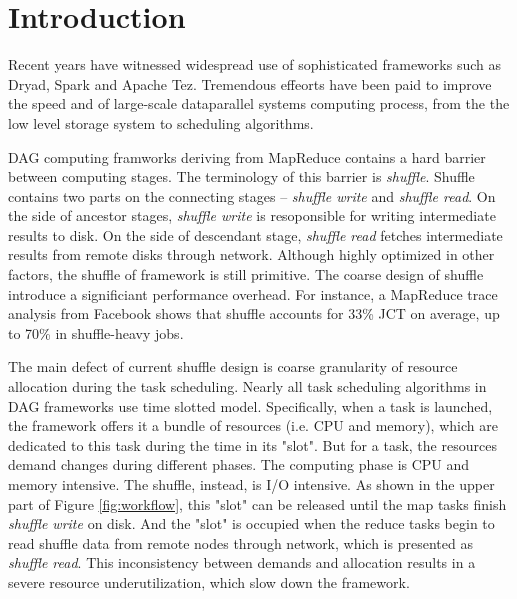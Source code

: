 \section{Introduction}

Recent years have witnessed widespread use of sophisticated frameworks such as Dryad\cite{dryad}, Spark\cite{spark} and Apache Tez\cite{tez}.
Tremendous effeorts have been paid to improve the speed and of large-scale dataparallel systems computing process, from the the low level storage system to scheduling algorithms.

DAG computing framworks deriving from MapReduce\cite{mapreduce} contains a hard barrier between computing stages. The terminology of this barrier is \textit{shuffle}. Shuffle contains two parts on the connecting stages -- \textit{shuffle write} and \textit{shuffle read}. On the side of ancestor stages, \textit{shuffle write} is resoponsible for writing intermediate results to disk. On the side of descendant stage, \textit{shuffle read} fetches intermediate results from remote disks through network. Although highly optimized in other factors, the shuffle of framework is still primitive.  The coarse design of shuffle introduce a significiant performance overhead.
For instance, a MapReduce trace analysis from Facebook shows that shuffle accounts for 33\% JCT on average, up to 70\% in shuffle-heavy jobs\cite{managing}.

The main defect of current shuffle design is coarse granularity of resource allocation during the task scheduling. 
Nearly all task scheduling algorithms in DAG frameworks use time slotted model. Specifically, when a task is launched, the framework offers it a bundle of resources (i.e. CPU and memory), which are dedicated to this task during the time in its "slot". 
But for a task, the resources demand changes during different phases. The computing phase is CPU and memory intensive. The shuffle, instead, is I/O intensive. 
As shown in the upper part of Figure \ref{fig:workflow}, this "slot" can be released until the map tasks finish \textit{shuffle write} on disk. And the "slot" is occupied when the reduce tasks begin to read shuffle data from remote nodes through network, which is presented as \textit{shuffle read}. This inconsistency between demands and allocation results in a severe resource underutilization, which slow down the framework.


